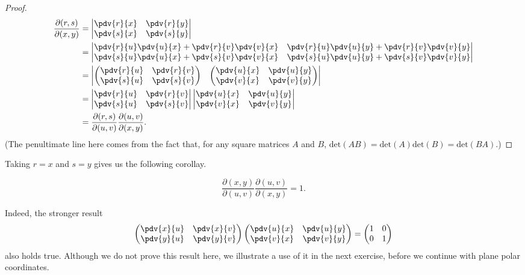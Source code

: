 \begin{proof}
\begin{align*}
\frac{\partial(r,s)}{\partial(x,y)}
&=\begin{vmatrix}
\pdv{r}{x}&\pdv{r}{y}\\
\pdv{s}{x}&\pdv{s}{y}
\end{vmatrix}\\
&=\begin{vmatrix}
\pdv{r}{u}\pdv{u}{x}+\pdv{r}{v}\pdv{v}{x}&\pdv{r}{u}\pdv{u}{y}+\pdv{r}{v}\pdv{v}{y}\\
\pdv{s}{u}\pdv{u}{x}+\pdv{s}{v}\pdv{v}{x}&\pdv{s}{u}\pdv{u}{y}+\pdv{s}{v}\pdv{v}{y}
\end{vmatrix}\\
&=\begin{vmatrix}
\begin{pmatrix}
\pdv{r}{u}&\pdv{r}{v}\\
\pdv{s}{u}&\pdv{s}{v}
\end{pmatrix} &
\begin{pmatrix}
\pdv{u}{x}&\pdv{u}{y}\\
\pdv{v}{x}&\pdv{v}{y}
\end{pmatrix}
\end{vmatrix}\\
&=\begin{vmatrix}
\pdv{r}{u}&\pdv{r}{v}\\
\pdv{s}{u}&\pdv{s}{v}
\end{vmatrix}
\begin{vmatrix}
\pdv{u}{x}&\pdv{u}{y}\\
\pdv{v}{x}&\pdv{v}{y}
\end{vmatrix}\\
&=\frac{\partial(r,s)}{\partial(u,v)}\frac{\partial(u,v)}{\partial(x,y)}.
\end{align*}
(The penultimate line here comes from the fact that, for any square matrices $A$ and $B$, $\mathrm{det}(AB)=\mathrm{det}(A)\mathrm{det}(B)=\mathrm{det}(BA)$.)
\end{proof}

Taking $r=x$ and $s=y$ gives us the following corollay.

\begin{corollary}
\[\frac{\partial(x,y)}{\partial(u,v)}\frac{\partial(u,v)}{\partial(x,y)}=1.\]
\end{corollary}

Indeed, the stronger result
\[\begin{pmatrix}
\pdv{x}{u}&\pdv{x}{v}\\
\pdv{y}{u}&\pdv{y}{v}
\end{pmatrix}
\begin{pmatrix}
\pdv{u}{x}&\pdv{u}{y}\\
\pdv{v}{x}&\pdv{v}{y}
\end{pmatrix}=
\begin{pmatrix}
1&0\\0&1
\end{pmatrix}
\]
also holds true. Although we do not prove this result here, we illustrate a use of it in the next exercise, before we continue with plane polar coordinates.

